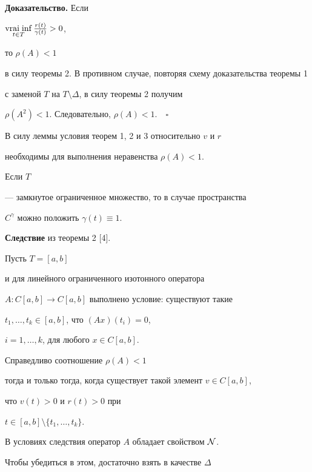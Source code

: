 {\bf Доказательство.} Если


$\vraiinf\limits_{t\in T} \frac{r(t)}{\gamma(t)} >0$,


то $\rho(A)<1$


в силу теоремы 2. В противном случае, повторяя схему доказательства теоремы 1


с заменой $T$ на $T\setminus\Delta$, в силу теоремы 2 получим


$\rho(A^2)<1$. Следовательно, $\rho(A)<1.\quad\square$





\begin{note}


В силу леммы условия теорем 1, 2 и 3 относительно $v$ и $r$


необходимы для выполнения неравенства $\rho(A)<1$.


\end{note}





Если $T$


--- замкнутое ограниченное множество, то в случае пространства


$C^\gamma$ можно положить $\gamma(t)\equiv 1$.


\medskip





{\bf Следствие} из теоремы 2 [4].


Пусть $T=[a,b]$


и для линейного ограниченного изотонного оператора


$A:C[a,b]\to C[a,b]$ выполнено условие: существуют такие


$t_1,\dotsc,t_k\in[a,b]$, что $(Ax)(t_i)=0$,


$i=1,\dotsc,k$, для любого $x\in C[a,b]$.


Справедливо соотношение $\rho(A)<1$


тогда и только тогда, когда существует такой элемент $v\in C[a,b]$,


что $v(t)>0$ и $r(t)>0$ при


$t\in[a,b]\setminus\{t_1,\dotsc,t_k\}$.


\medskip





В условиях следствия оператор $A$ обладает свойством $\cal N$.


Чтобы убедиться в этом, достаточно взять в качестве $\Delta$


